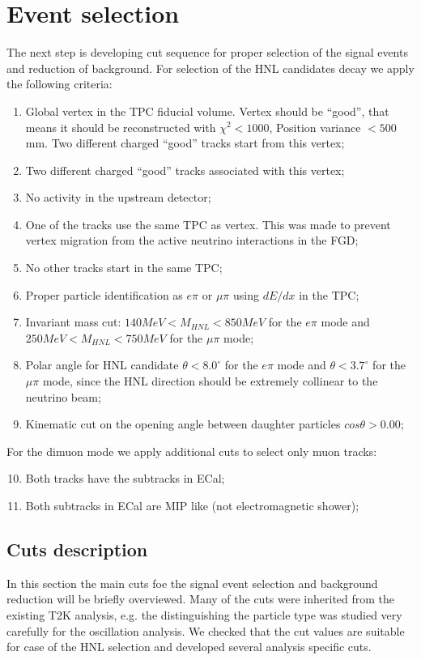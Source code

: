 \documentclass[../main.tex]{subfiles}
\begin{document}
\section{Event selection}
\label{sec:HNL:sel}

The next step is developing cut sequence for proper selection of the signal events and reduction of background. For selection of the HNL candidates decay we apply the following criteria:
\begin{enumerate}
  \item Global vertex in the TPC fiducial volume. Vertex should be ``good'', that means it should be reconstructed with $\chi^2<1000$, Position variance $<500$ mm. Two different charged ``good'' tracks start from this vertex;
  \item Two different charged ``good'' tracks associated with this vertex;
  \item No activity in the upstream detector;
  \item One of the tracks use the same TPC as vertex. This was made to prevent vertex migration from the active neutrino interactions in the FGD;
  \item No other tracks start in the same TPC;
  \item Proper particle identification as $e\pi$ or $\mu \pi$ using $dE/dx$ in the TPC;
  \item Invariant mass cut: $140MeV<M_{HNL}<850MeV$ for the $e\pi$ mode and $250MeV<M_{HNL}<750MeV$ for the $\mu \pi$ mode;
  \item Polar angle for HNL candidate $\theta < 8.0^\circ$ for the $e\pi$ mode and $\theta < 3.7^\circ$ for the $\mu\pi$ mode, since the HNL direction should be extremely collinear to the neutrino beam;
  \item Kinematic cut on the opening angle between daughter particles $cos\theta >0.00$;
\end{enumerate}

For the dimuon mode we apply additional cuts to select only muon tracks:

\begin{enumerate}
  \setcounter{enumi}{9}
  \item Both tracks have the subtracks in ECal;
  \item Both subtracks in ECal are MIP like (not electromagnetic shower);
\end{enumerate}

\subsection{Cuts description}
In this section the main cuts foe the signal event selection and background reduction will be briefly overviewed. Many of the cuts were inherited from the existing T2K analysis, e.g. the distinguishing the particle type was studied very carefully  for the oscillation analysis. We checked that the cut values are suitable for case of the HNL selection and developed several analysis specific cuts.
\end{document}

